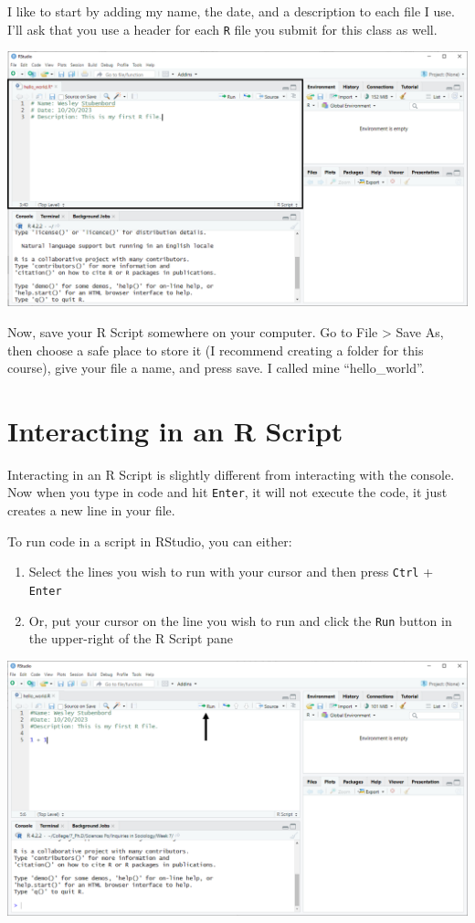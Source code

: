 \documentclass[
  letterpaper,
]{book}
\providecommand{\tightlist}{%
  \setlength{\itemsep}{0pt}\setlength{\parskip}{0pt}}\usepackage{longtable,booktabs,array}
\begin{document}
I like to start by adding my name, the date, and a description to each
file I use. I'll ask that you use a header for each \texttt{R} file you
submit for this class as well.

\includegraphics{images/RStudio_Commenting in an R Script file.png}

Now, save your R Script somewhere on your computer. Go to File
\textgreater{} Save As, then choose a safe place to store it (I
recommend creating a folder for this course), give your file a name, and
press save. I called mine ``hello\_world''.

\hypertarget{interacting-in-an-r-script}{%
\section{Interacting in an R Script}\label{interacting-in-an-r-script}}

Interacting in an R Script is slightly different from interacting with
the console. Now when you type in code and hit \texttt{Enter}, it will
not execute the code, it just creates a new line in your file.

To run code in a script in RStudio, you can either:

\begin{enumerate}
\def\labelenumi{\arabic{enumi}.}
\tightlist
\item
  Select the lines you wish to run with your cursor and then press
  \texttt{Ctrl} + \texttt{Enter}
\item
  Or, put your cursor on the line you wish to run and click the
  \texttt{Run} button in the upper-right of the R Script pane
\end{enumerate}

\includegraphics{images/RStudio_Run button.png}
\end{document}
